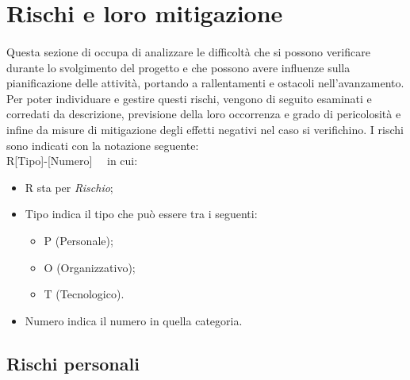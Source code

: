 \documentclass[10pt, a4paper]{article}
\begin{document}

\section{Rischi e loro mitigazione}
\paragraph{}Questa sezione di occupa di analizzare le difficoltà che si possono verificare durante lo svolgimento del progetto e che possono avere influenze sulla pianificazione delle attività, portando a rallentamenti e ostacoli nell'avanzamento.\\
Per poter individuare e gestire questi rischi, vengono di seguito esaminati e corredati da descrizione, previsione della loro occorrenza e grado di pericolosità e infine da misure di mitigazione degli effetti negativi nel caso si verifichino.
I rischi sono indicati con la notazione seguente: \\ R[Tipo]-[Numero] \ \  in cui:
\begin{itemize}
\item R sta per \textit{Rischio};
\item Tipo indica il tipo che può essere tra i seguenti:
    \begin{itemize}
	\item P (Personale);
	\item O (Organizzativo);
	\item T (Tecnologico).
    \end{itemize}
\item Numero indica il numero in quella categoria.
\end{itemize}



\subsection{Rischi personali}

\end{document}
